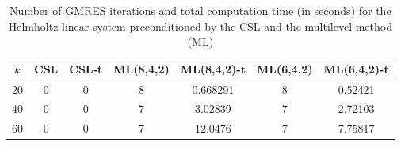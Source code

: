 \begin{table}[t]
\centering
\begin{tabular}{ccccccc}
\hline
$k$ & CSL & CSL-t & ML(8,4,2) & ML(8,4,2)-t& ML(6,4,2) & ML(6,4,2)-t \\ \hline
20 & 0 & 0 & 8 & 0.668291 & 8 & 0.52421 \\
40 & 0 & 0 & 7 & 3.02839 & 7 & 2.72103 \\
60 & 0 & 0 & 7 & 12.0476 & 7 & 7.75817 \\
\hline
\end{tabular}
\caption{Number of GMRES iterations and total computation time (in seconds) for the Helmholtz linear system preconditioned by the  CSL and the multilevel method (ML)}
\label{table:mlgmres_csl_vs_adef_coarse_eps_20}
\end{table}
